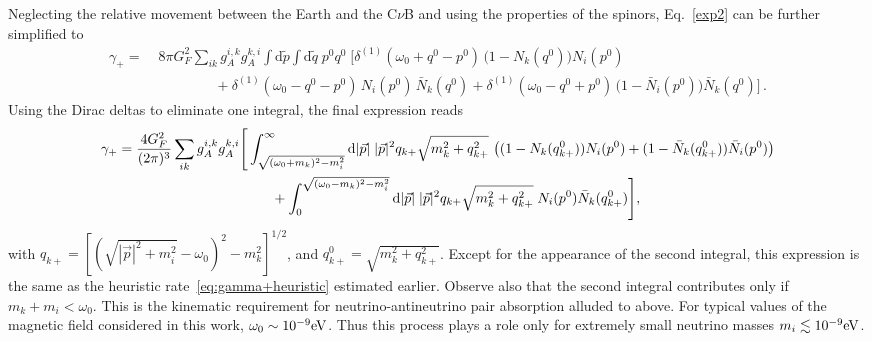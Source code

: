 \documentclass[aps,prd,10pt,twocolumn,superscriptaddress,floatfix,nofootinbib,amsmath,amssymb,altaffilletter,preprintnumbers]{revtex4-1}
\begin{document}
 
Neglecting the relative movement between the Earth and the C$\nu$B and using the properties of the spinors, Eq.~\eqref{exp2} can be further simplified to 
\begin{equation}
\begin{aligned}
\gamma_+ =\; & 8\pi G_F^2 \sum_{ik} g_A^{i,k} g_A^{k,i}  
    \int \mathrm{d} \tilde{p} \int \mathrm{d} \tilde{q} \; 
    p^0 q^0 \; \Big[ 
 \delta^{(1)}(\omega_0 + q^0 - p^0)\,\big(1 - N_k(q^0)\big) N_i(p^0) \\
&\qquad \qquad + \delta^{(1)}(\omega_0 - q^0 - p^0)\, N_i(p^0)\, \bar{N}_k(q^0) + \delta^{(1)}(\omega_0 - q^0 + p^0)\, \big(1 - \bar{N}_i(p^0)\big)\bar{N}_k(q^0) 
\Big]\,.
\end{aligned}
\label{eq:gamma_plus}
\end{equation}
Using the Dirac deltas to eliminate one integral, the final expression reads
\begin{equation}
\begin{aligned}
    \gamma_{+}=&\; \frac{4G_F^2}{(2 \pi)^3} \sum_{ik} g_A^{i,k} g_A^{k,i}  \Bigg[
    \int_{\sqrt{(\omega_0+m_k)^2-m_i^2}}^\infty  {\rm d} |\vec{p}|\; |\vec{p}|^2q_{k+}\sqrt{m_k^2+q_{k+}^2} \,  \left((1- N_{k}(q_{k+}^0))N_i(p^0)+(1- \bar{N}_k(q_{k+}^0))\bar{N}_i(p^0) \right) \\
   &\hspace{35mm} + \int_0^{\sqrt{(\omega_0-m_k)^2-m_i^2}} {\rm d} |\vec{p}|\;   |\vec{p}|^2q_{k+}\sqrt{m_k^2+q_{k+}^2} \; N_i(p^0)\bar{N}_k(q_{k+}^0) \Bigg],
    \label{exp3}
\end{aligned}
\end{equation}
with $q_{k+}=[(\sqrt{|\vec{p}|^2+m_i^2}-\omega_0)^2-m_k^2]^{1/2}$, and $q_{k+}^0=\sqrt{m_k^2+q_{k+}^2}$. Except for the appearance of the second integral, this expression is the same as the heuristic rate~\eqref{eq:gamma+heuristic} estimated earlier.
Observe also that the second integral contributes only if $m_k+m_i<\omega_0$. This is the kinematic requirement for neutrino-antineutrino pair absorption alluded to above. For typical values of the magnetic field considered in this work, $\omega_0\sim10^{-9} \rm eV$. Thus this process plays a role only for extremely small neutrino masses $m_i\lesssim10^{-9} \rm eV$.
\end{document}
